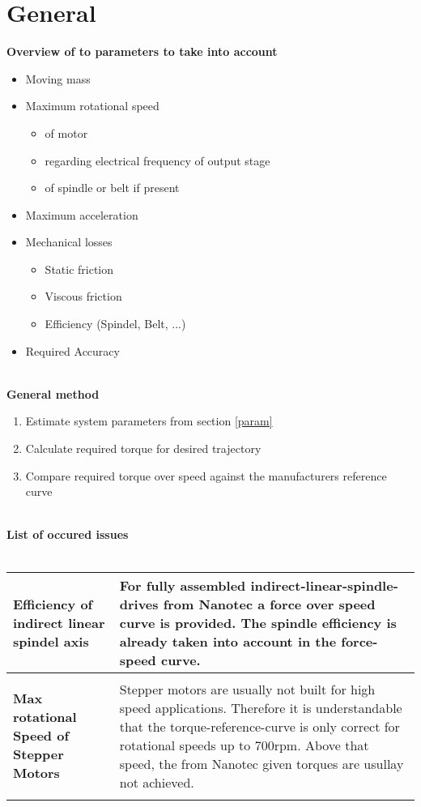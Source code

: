 \part{General}

	\textbf{Overview of to parameters to take into account}\label{param}
		\begin{itemize}
			\item Moving mass
			\item Maximum rotational speed
			\begin{itemize}
				\item of motor 
				\item regarding electrical frequency of output stage
				\item of spindle or belt if present
			\end{itemize}
			\item Maximum acceleration
			\item Mechanical losses
			\begin{itemize}
				\item Static friction
				\item Viscous friction
				\item Efficiency (Spindel, Belt, ...)
			\end{itemize}
			\item Required Accuracy
		\end{itemize}
	\leavevmode\\
	
	\textbf{General method}
		\begin{enumerate}
			\item Estimate system parameters from section \ref{param}
			\item Calculate required torque for desired trajectory 
			\item Compare required torque over speed against the manufacturers reference curve
		\end{enumerate}
	\leavevmode\\
	
	\textbf{List of occured issues}\leavevmode\\\\
		\begin{tabular}{p{4cm}p{12cm}}
			\rowcolor{gray!10!white}
			\textbf{Efficiency of indirect linear spindel axis} & 
			For fully assembled indirect-linear-spindle-drives from Nanotec a force over speed curve is provided. The spindle efficiency is already taken into account in the force-speed curve.
			\\\hline&\\
			\rowcolor{gray!00!white}
			\textbf{Max rotational Speed of Stepper Motors} & 
			Stepper motors are usually not built for high speed applications. Therefore it is understandable that the torque-reference-curve is only correct for rotational speeds up to 700rpm. Above that speed, the from Nanotec given torques are usullay not achieved. \\\hline&\\
		\end{tabular}